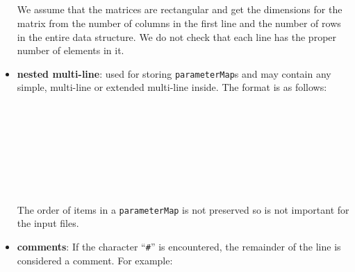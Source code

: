 \documentclass[10pt]{article}
\begin{document}
\begin{itemize}
			\hspace*{0.5 in}{\tt value00 value01 value02 ...}\\
			\hspace*{0.5 in}{\tt value10 value11 value12 ...}\\
			\hspace*{0.5 in}{\tt ...}\\
			\hspace*{0.25 in}{\tt \}}\\
	We assume that the matrices are rectangular and get the dimensions for the matrix from the number of columns in the first line and the number of rows in the entire data structure.  We do not check that each line has the proper number of elements in it.
	\item {\bf nested multi-line}: used for storing {\tt parameterMap}s and may contain any simple, multi-line or extended multi-line inside.  The format is as follows:\\
			\\
			\hspace*{0.5 in}{\tt subtype0 subname0 subvalue0}\\
			\\
			\hspace*{0.75 in}{\tt value11}\\
			\hspace*{0.75 in}{\tt ...}\\
			\hspace*{0.5 in}{\tt \} } \\
			\hspace*{0.5 in}{\tt ...}\\
			\hspace*{0.25 in}{\tt \} }\\
	The order of items in a {\tt parameterMap} is not preserved so is not important for the input files.
	\item {\bf comments}: If the character ``{\tt \#}'' is encountered, the remainder of the line is considered a comment.  For example:\\
			\hspace*{0.25 in}{\tt \#int   lmax   0 \# the old value}\\
			\hspace*{0.25 in}{\tt int   lmax   2 \# the new value}\\
			\hspace*{0.25 in}{\tt string	filename	output.dat \# this is the output correlation}\\
\end{itemize}
\end{document}
